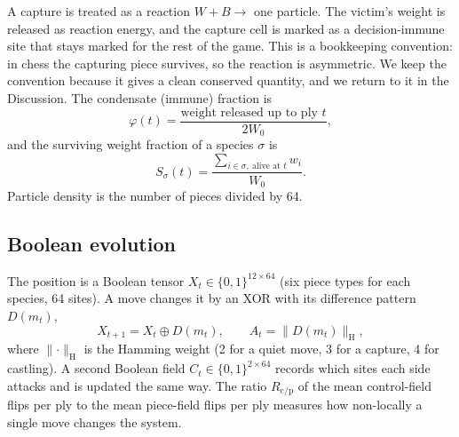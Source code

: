 \documentclass[11pt,a4paper]{article}
\begin{document}
A capture is treated as a reaction $W+B\to$ one particle. The victim's weight is released as reaction energy, and the capture cell is marked as a decision-immune site that stays marked for the rest of the game. This is a bookkeeping convention: in chess the capturing piece survives, so the reaction is asymmetric. We keep the convention because it gives a clean conserved quantity, and we return to it in the Discussion. The condensate (immune) fraction is
\begin{equation}
\varphi(t)=\frac{\text{weight released up to ply } t}{2W_0},
\end{equation}
and the surviving weight fraction of a species $\sigma$ is
\begin{equation}
S_\sigma(t)=\frac{\sum_{i\in\sigma,\ \text{alive at } t} w_i}{W_0}.
\end{equation}
Particle density is the number of pieces divided by 64.

\subsection{Boolean evolution}
The position is a Boolean tensor $X_t\in\{0,1\}^{12\times 64}$ (six piece types for each species, 64 sites). A move changes it by an XOR with its difference pattern $D(m_t)$,
\begin{equation}
X_{t+1}=X_t\oplus D(m_t),\qquad A_t=\lVert D(m_t)\rVert_{\mathrm{H}},
\end{equation}
where $\lVert\cdot\rVert_{\mathrm H}$ is the Hamming weight (2 for a quiet move, 3 for a capture, 4 for castling). A second Boolean field $C_t\in\{0,1\}^{2\times64}$ records which sites each side attacks and is updated the same way. The ratio $R_{\mathrm{c/p}}$ of the mean control-field flips per ply to the mean piece-field flips per ply measures how non-locally a single move changes the system.
\end{document}

